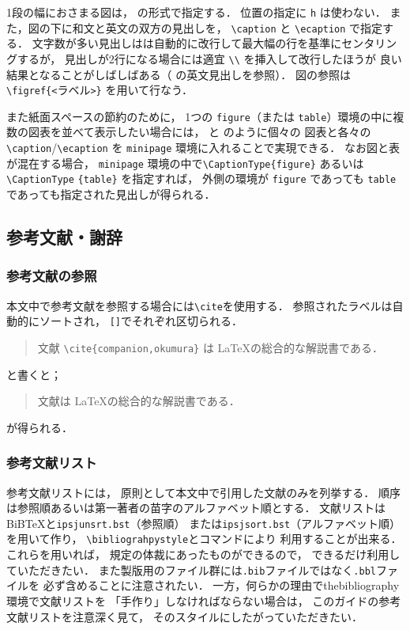\documentclass[submit,noauthor]{ono}
\def\|{\verb|}
\begin{document}
1段の幅におさまる図は，
 の形式で指定する．
位置の指定に \|h| は使わない．
また，図の下に和文と英文の双方の見出しを，
\|\caption| と \|\ecaption| で指定する．
文字数が多い見出しはは自動的に改行して最大幅の行を基準にセンタリングするが，
見出しが2行になる場合には適宜 \|\\| を挿入して改行したほうが
良い結果となることがしばしばある（ の英文見出しを参照）．
図の参照は \|\figref{<|ラベル\|>}| を用いて行なう．


また紙面スペースの節約のために，
1つの \|figure|（または \|table|）環境の中に複数の図表を並べて表示したい場合には，
 と  のように個々の
図表と各々の \|\caption|/\|\ecaption| を \|minipage| 環境に入れることで実現できる．
なお図と表が混在する場合，
\|minipage| 環境の中で\|\CaptionType{figure}| あるいは \|\CaptionType| \|{table}| を指定すれば，
外側の環境が \|figure| であっても \|table| であっても指定された見出しが得られる．



\subsection{参考文献・謝辞}

\subsubsection{参考文献の参照}

本文中で参考文献を参照する場合には\|\cite|を使用する．
参照されたラベルは自動的にソートされ，
\|[]|でそれぞれ区切られる．
%
\begin{quote}
	文献 \|\cite{companion,okumura}| は \LaTeX の総合的な解説書である．
\end{quote}
%
と書くと；
%
\begin{quote}
	文献\cite{companion,okumura}は \LaTeX の総合的な解説書である．
\end{quote}
%
が得られる．

\subsubsection{参考文献リスト}
参考文献リストには，
原則として本文中で引用した文献のみを列挙する．
順序は参照順あるいは第一著者の苗字のアルファベット順とする．
文献リストはBiB\TeX と\verb+ipsjunsrt.bst+（参照順）
または\verb+ipsjsort.bst+（アルファベット順）を用いて作り，
\verb+\bibliograhpystyle+と\verb++コマンドにより
利用することが出来る．
これらを用いれば，
規定の体裁にあったものができるので，
できるだけ利用していただきたい．
また製版用のファイル群には\verb+.bib+ファイルではなく\verb+.bbl+ファイルを
必ず含めることに注意されたい．
一方，何らかの理由でthebibliography環境で文献リストを
「手作り」しなければならない場合は，
このガイドの参考文献リストを注意深く見て，
そのスタイルにしたがっていただきたい．
\end{document}
